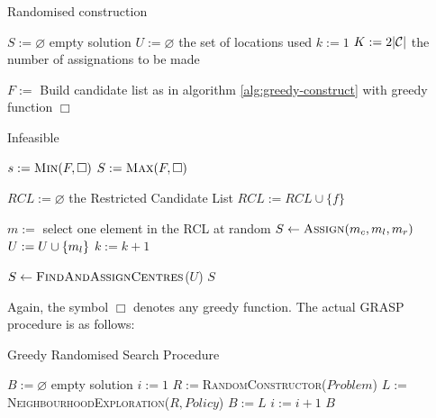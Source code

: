 \begin{algorithm}[H]
    \label{alg:random-constructor}
    \DontPrintSemicolon
    
    \caption{Randomised construction}
    
     {
        $S := \varnothing$ empty solution \;
        $U := \varnothing$ the set of locations used\;
        $k := 1$\;
        $K := 2|\mathcal{C}|$ the number of assignations to be made\;
         {
            $F := $ Build candidate list as in algorithm \ref{alg:greedy-construct}
                with greedy function $\Box$\;
                
             {
                \Return Infeasible
            }
            
            $s := \textsc{Min}(F, \Box)$\;
            $S := \textsc{Max}(F, \Box)$\;
            
            $RCL := \varnothing$ the Restricted Candidate List\;
             {
                 {
                    $RCL := RCL \cup \{ f \}$
                }
            }
            
            $m := $ select one element in the RCL at random\;
            $S \leftarrow \textsc{Assign}(m_c, m_l, m_r)$\;
            $U := U \cup \{ m_l \}$\;
            $k := k + 1$\;
        }
        $S \leftarrow \textsc{FindAndAssignCentres}$($U$)\;
        \Return $S$\;
    }
\end{algorithm}

\hfill

Again, the symbol $\Box$ denotes any greedy function. The actual GRASP procedure is as
follows:

\hfill

\begin{algorithm}[H]
    \label{alg:grasp}
    \DontPrintSemicolon
    
    \caption{Greedy Randomised Search Procedure}
    
     {
        $B := \varnothing$ empty solution\;
        $i := 1$\;
         {
            $R := $\textsc{RandomConstructor}($Problem$)\;
            $L := $\textsc{NeighbourhoodExploration}($R, Policy$)\;
             {
                $B := L$
            }
            $i := i + 1$\;
        }
        \Return $B$\;
    }
\end{algorithm}

